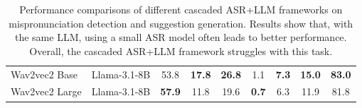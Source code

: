 \begin{table}[t]
\begin{tabular}{llccccccc}
\midrule[0.5pt]
Wav2vec2 Base     & Llama-3.1-8B       & 53.8 & \textbf{17.8} & \textbf{26.8} & 1.1 & \textbf{7.3} & \textbf{15.0} & \textbf{83.0} \\
Wav2vec2 Large    & Llama-3.1-8B     & \textbf{57.9} & 11.8 & 19.6 & \textbf{0.7} & 6.3 & 11.9 & 81.8 \\
\bottomrule[1pt]
\end{tabular}
\caption{Performance comparisons of different cascaded ASR+LLM frameworks on mispronunciation detection and suggestion generation. Results show that, with the same LLM, using a small ASR model often leads to better performance. Overall, the cascaded ASR+LLM framework struggles with this task.}
\label{tab:cascade_asr_llm_eval_result}

\vspace{-2mm}
\end{table}


